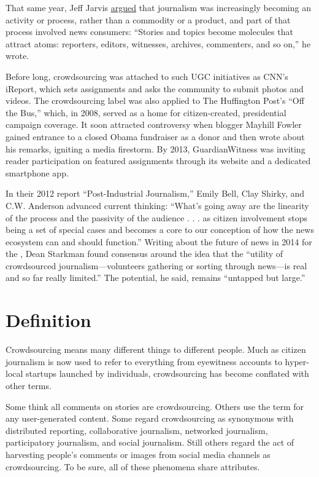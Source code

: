 \begin{itemize}
That same year, Jeff Jarvis \href{http://buzzmachine.com/2008/04/14/the-press-becomes-the-press-sphere/}{argued} that journalism was increasingly becoming an activity or process, rather than a commodity or a product, and part of that process involved news consumers: ``Stories and topics become molecules that attract atoms: reporters, editors, witnesses, archives, commenters, and so on,'' he wrote.\autocite{Jarvis}

Before long, crowdsourcing was attached to such UGC initiatives as CNN’s iReport, which sets assignments and asks the community to submit photos and videos. The crowdsourcing label was also applied to The Huffington Post’s ``Off the Bus,'' which, in 2008, served as a home for citizen-created, presidential campaign coverage. It soon attracted controversy when blogger Mayhill Fowler gained entrance to a closed Obama fundraiser as a donor and then wrote about his remarks, igniting a media firestorm. By 2013, GuardianWitness was inviting reader participation on featured assignments through its website and a dedicated smartphone app. 

In their 2012 report ``Post-Industrial Journalism,'' Emily Bell, Clay Shirky, and C.W. Anderson advanced current thinking: ``What’s going away are the linearity of the process and the passivity of the audience . . . as citizen involvement stops being a set of special cases and becomes a core to our conception of how the news ecosystem can and should function.''\autocite{Tow}
Writing about the future of news in 2014 for the , Dean Starkman found consensus around the idea that the ``utility of crowdsourced journalism---volunteers gathering or sorting through news---is real and so far really limited.'' The potential, he said, remains ``untapped but large.''\autocite{CJR}

\chapter{Definition}  

Crowdsourcing means many different things to different people. Much as citizen journalism is now used to refer to everything from eyewitness accounts to hyper-local startups launched by individuals, crowdsourcing has become conflated with other terms.

Some think all comments on stories are crowdsourcing. Others use the term for any user-generated content. Some regard crowdsourcing as synonymous with distributed reporting, collaborative journalism, networked journalism, participatory journalism, and social journalism. Still others regard the act of harvesting people’s comments or images from social media channels as crowdsourcing. To be sure, all of these phenomena share attributes.


\end{itemize}

